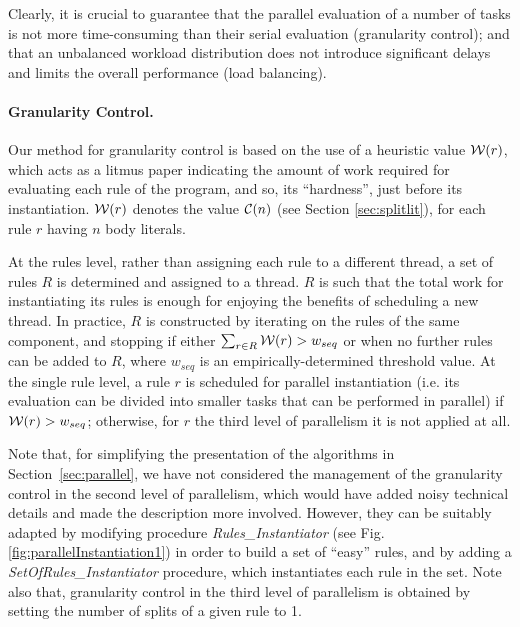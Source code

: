 \documentclass[preprint]{tlp}
\newcommand{\w}[1]{\ensuremath{{\cal W}(#1)}\xspace }
\begin{document}
Clearly, it is crucial to guarantee that the parallel evaluation of a number of tasks
is not more time-consuming than their serial evaluation (granularity control); and that
an unbalanced workload distribution does not introduce
significant delays and limits the overall performance (load balancing).

\paragraph{Granularity Control.}
Our method for granularity control is based on the use of a heuristic value \w{r},
which acts as a litmus paper indicating the amount of work required for evaluating each rule of the program,
and so, its ``hardness'', just before its instantiation.
\w{r} denotes the value ${\cal C}(n)$ (see Section \ref{sec:splitlit}), for each rule $r$ having $n$ body literals.

At the rules level, rather than assigning each rule to a different thread, a set of rules $R$ is determined and assigned to a thread.
$R$ is such that the total work for instantiating its rules
is enough for enjoying the benefits of scheduling a new thread.
In practice, $R$ is constructed by iterating on the rules of the same component, and
stopping if either $\sum_{r \in R}\w{r}  > w_{seq}$ or when no further rules can be added to $R$,
where $w_{seq}$ is an empirically-determined threshold value.
At the single rule level, a rule $r$ is scheduled for parallel instantiation (i.e.
its evaluation can be divided into smaller tasks that can be performed in parallel)
if $\w{r}>w_{seq}$; otherwise, for $r$ the third level of parallelism it is not applied at all.

Note that, for simplifying the presentation of the algorithms in Section~\ref{sec:parallel},
we have not considered the management of the granularity control in the second level of parallelism,
which would have added noisy technical details and made the description more involved.
However, they can be suitably adapted by modifying procedure {\em Rules\_Instantiator} (see Fig.\ref{fig:parallelInstantiation1})
in order to build a set of ``easy'' rules, and by adding a {\em SetOfRules\_Instantiator} procedure, which instantiates each rule in the set.
Note also that, granularity control in the third level of parallelism is obtained by setting the number of splits of a given rule to 1.
\end{document}
